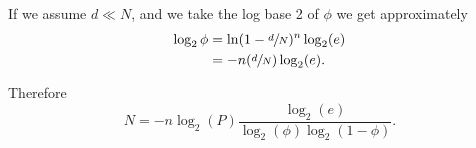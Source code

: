 \documentclass{subfiles}
\begin{document}
        If we assume \(d \ll N\), and we take the log base 2 of \(\phi\) we get approximately 
        \[\begin{aligned}
            \log_{2} \phi & =  \ln (1 - \sfrac{d}{N})^{n} \log_{2} (e) \\ 
                    & = -n (\sfrac{d}{N}) \log_{2} (e).
        \end{aligned}\]

    Therefore
    \[
        N = -n\log_{2} (P) \frac{\log_{2} (e)}{\log_{2} (\phi) \log_{2} (1 - \phi) }.
    \]
\end{document}
